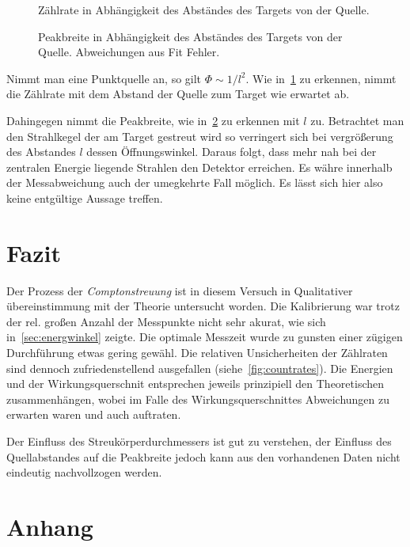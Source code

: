 \documentclass[slug=CS, room=Andreas-Schubert-Bau\,\ Labor\ 406,
supervisor=Juliane\ Volkmer, coursedate=29.\ 11.\ 2019]{../../Lab_Report_LaTeX/lab_report}
\newcommand{\cs}{\emph{Comptonstreuung }}
\begin{document}
\begin{figure}[h]\centering
  
  \caption{Zählrate in Abhängigkeit des Abständes des Targets von der Quelle.}
  \label{fig:dists-countrates}
\end{figure}

\begin{figure}[h]\centering
  
  \caption{Peakbreite in Abhängigkeit des Abständes des Targets von
    der Quelle. Abweichungen aus Fit Fehler.}
  \label{fig:dists-widths}
\end{figure}

Nimmt man eine Punktquelle an, so gilt \(\Phi\sim 1/l^2\). Wie
in~\ref{fig:dists-countrates} zu erkennen, nimmt die Zählrate mit dem
Abstand der Quelle zum Target wie erwartet ab.

Dahingegen nimmt die Peakbreite, wie in~\ref{fig:dists-widths} zu
erkennen mit \(l\) zu. Betrachtet man den Strahlkegel der am Target
gestreut wird so verringert sich bei vergr\"o\ss{}erung des Abstandes
\(l\) dessen \"Offnungswinkel. Daraus folgt, dass mehr nah bei der
zentralen Energie liegende Strahlen den Detektor erreichen. Es w\"ahre
innerhalb der Messabweichung auch der umegkehrte Fall m\"oglich. Es
l\"asst sich hier also keine entg\"ultige Aussage treffen.

\section{Fazit}
Der Prozess der \cs ist in diesem Versuch in Qualitativer
\"ubereinstimmung mit der Theorie untersucht worden. Die Kalibrierung
war trotz der rel. gro\ss{}en Anzahl der Messpunkte nicht sehr akurat,
wie sich in~\ref{sec:energwinkel} zeigte. Die optimale Messzeit wurde
zu gunsten einer z\"ugigen Durchf\"uhrung etwas gering gew\"ahl. Die
relativen Unsicherheiten der Zählraten sind dennoch zufriedenstellend
ausgefallen (siehe~\ref{fig:countrates}). Die Energien und der
Wirkungsquerschnit entsprechen jeweils prinzipiell den Theoretischen
zusammenh\"angen, wobei im Falle des Wirkungsquerschnittes
Abweichungen zu erwarten waren und auch auftraten.

Der Einfluss des Streukörperdurchmessers ist gut zu verstehen, der
Einfluss des Quellabstandes auf die Peakbreite jedoch kann aus den
vorhandenen Daten nicht eindeutig nachvollzogen werden.

\section{Anhang}
\label{sec:anshang}
\end{document}
